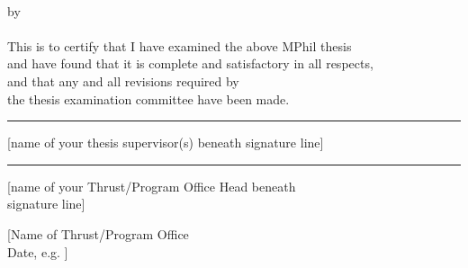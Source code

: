 \begin{signature}
    \begin{center}
    {\fontsize{12}{14}\selectfont \bfseries \myTitle} 
    \\
    \vspace{3\baselineskip}
    {\fontsize{12}{14} by 
    \vspace{2\baselineskip}
    \\ \textbf{\selectfont \myName}}
    \vspace{2\baselineskip}
    \\ \selectfont This is to certify that I have examined the above MPhil thesis \\
    and have found that it is complete and satisfactory in all respects, \\
    and that any and all revisions required by \\
    the thesis examination committee have been made.
    \vspace{2\baselineskip}
     \\\begin{center}
    \rule{1\textwidth}{0.5pt} %
    \end{center}
    \begin{center}
    [name of your thesis supervisor(s) beneath signature line]
    \end{center}

    \vspace{3\baselineskip}
    \begin{center}
    \rule{0.5\textwidth}{0.5pt} %
    \end{center}
    \begin{center}
    [name of your Thrust/Program Office Head beneath \\
signature line]
    \end{center}

    \vspace{1\baselineskip}
    \begin{center}
    [Name of Thrust/Program Office \\ 
    Date, e.g. \myDate]
    \end{center}
    
    \end{center}
\end{signature}
